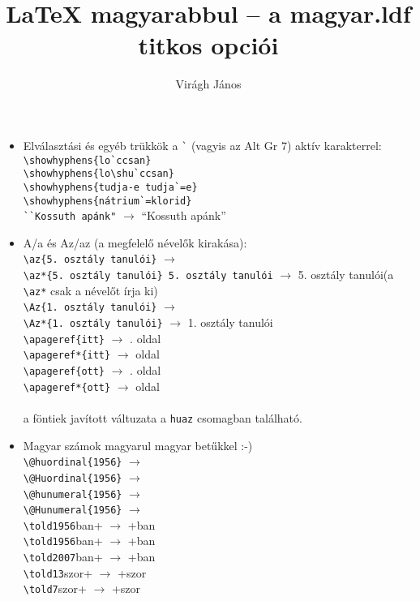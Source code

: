 \documentclass{article}
\title{\LaTeX{}  magyarabbul -- a magyar.ldf titkos opciói}
\author{Virágh János}
\begin{document}
\maketitle
\begin{itemize}
 \item Elválasztási és egyéb trükkök a \verb+`+ (vagyis az Alt Gr 7) aktív karakterrel:\\
 \verb+\showhyphens{lo`ccsan}+ \\
 \verb+\showhyphens{lo\shu`ccsan}+ \\
\verb+\showhyphens{tudja-e tudja`=e} +\\
\verb+\showhyphens{nátrium`=klorid}+ \\
\verb+``Kossuth apánk"+ $\longrightarrow$ ``Kossuth apánk''
\item A/a és Az/az (a megfelelő névelők kirakása):\\
\verb+\az{5. osztály tanulói}+ $\longrightarrow$ \\
\verb+\az*{5. osztály tanulói} 5. osztály tanulói+ $\longrightarrow$  5. osztály tanulói(a \verb+\az*+ csak a névelőt írja ki)\\
\verb+\Az{1. osztály tanulói}+ $\longrightarrow$ \\
\verb+\Az*{1. osztály tanulói}+ $\longrightarrow$  1. osztály tanulói\\
\verb+\apageref{itt}+ $\longrightarrow$ . oldal  \\
\verb+\apageref*{itt}+ $\longrightarrow$  oldal  \\
\verb+\apageref{ott}+ $\longrightarrow$ . oldal  \\
\verb+\apageref*{ott}+ $\longrightarrow$  oldal  \\
\\ a föntiek javított váltuzata a \verb+huaz+ csomagban található.
\item Magyar számok magyarul magyar betűkkel :-)\\
\makeatletter
\verb+\@huordinal{1956}+ $\longrightarrow$ \\
\verb+\@Huordinal{1956}+ $\longrightarrow$ \\
\verb+\@hunumeral{1956}+ $\longrightarrow$ \\
\verb+\@Hunumeral{1956}+ $\longrightarrow$ \\
\makeatother
\verb+\told1956+ban{}+ $\longrightarrow$ +ban{}\\
\verb+\told1956+ban{}+ $\longrightarrow$ +ban{}\\
\verb+\told2007+ban{}+ $\longrightarrow$ +ban{}\\
\verb+\told13+szor{}+ $\longrightarrow$ +szor{}\\
\verb+\told7+szor{}+ $\longrightarrow$ +szor{}\\


\end{itemize}
\end{document}
